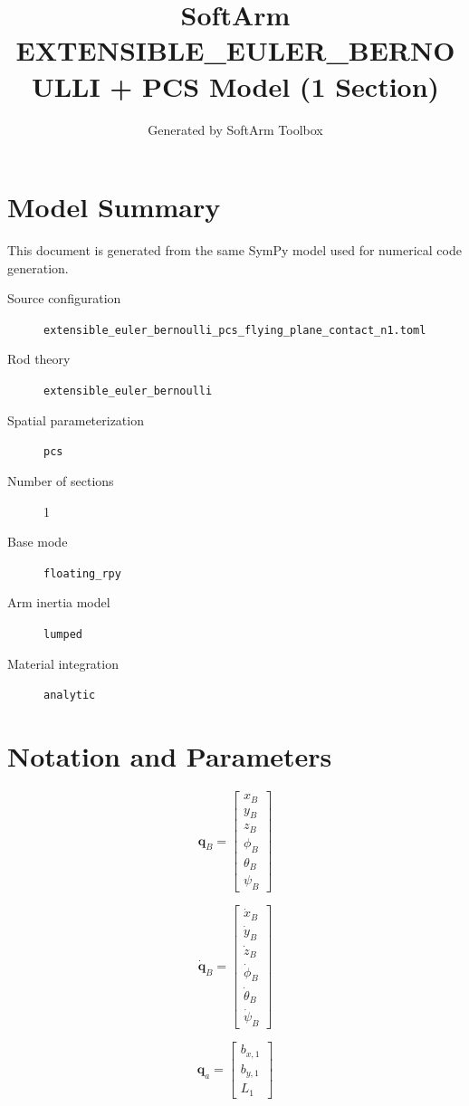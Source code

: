 \documentclass[11pt]{article}
\title{SoftArm EXTENSIBLE\_EULER\_BERNOULLI + PCS Model (1 Section)}
\author{Generated by SoftArm Toolbox}
\date{}
\begin{document}
\maketitle

\section{Model Summary}
This document is generated from the same SymPy model used for numerical code generation.
\begin{description}
\item[Source configuration] \texttt{extensible\_euler\_bernoulli\_pcs\_flying\_plane\_contact\_n1.toml}
\item[Rod theory] \texttt{extensible\_euler\_bernoulli}
\item[Spatial parameterization] \texttt{pcs}
\item[Number of sections] 1
\item[Base mode] \texttt{floating\_rpy}
\item[Arm inertia model] \texttt{lumped}
\item[Material integration] \texttt{analytic}
\end{description}

\section{Notation and Parameters}
\begin{equation}
\boldsymbol q_B=\begin{bmatrix}x_B\\y_B\\z_B\\\phi_B\\\theta_B\\\psi_B\end{bmatrix}
\end{equation}

\begin{equation}
\dot{\boldsymbol q}_B=\begin{bmatrix}\dot{x}_B\\\dot{y}_B\\\dot{z}_B\\\dot{\phi}_B\\\dot{\theta}_B\\\dot{\psi}_B\end{bmatrix}
\end{equation}

\begin{equation}
\boldsymbol q_a=\begin{bmatrix}b_{x,1}\\b_{y,1}\\L_{1}\end{bmatrix}
\end{equation}
\end{document}
